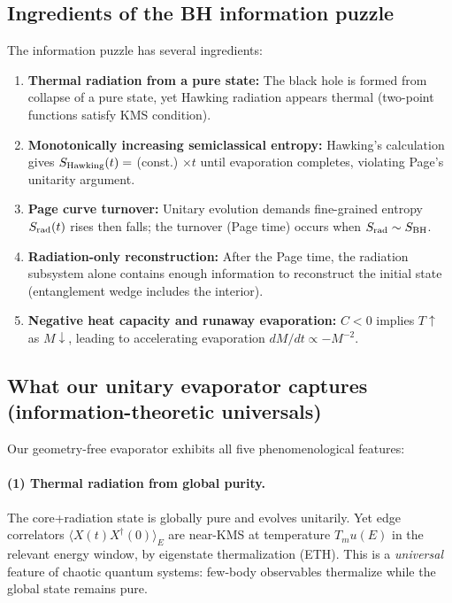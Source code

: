 \documentclass[aps,prx,onecolumn,showpacs,superscriptaddress,longbibliography,nofootinbib]{revtex4-2}
\def\mu{mu}%
\begin{document}
\subsection{Ingredients of the BH information puzzle}

The information puzzle has several ingredients:
\begin{enumerate}[leftmargin=*]
\item \textbf{Thermal radiation from a pure state:} The black hole is formed from collapse of a pure state, yet Hawking radiation appears thermal (two-point functions satisfy KMS condition).
\item \textbf{Monotonically increasing semiclassical entropy:} Hawking's calculation gives $S_{\rm Hawking}(t) = $ (const.) $ \times t$ until evaporation completes, violating Page's unitarity argument.
\item \textbf{Page curve turnover:} Unitary evolution demands fine-grained entropy $S_{\rm rad}(t)$ rises then falls; the turnover (Page time) occurs when $S_{\rm rad} \sim S_{\rm BH}$.
\item \textbf{Radiation-only reconstruction:} After the Page time, the radiation subsystem alone contains enough information to reconstruct the initial state (entanglement wedge includes the interior).
\item \textbf{Negative heat capacity and runaway evaporation:} $C < 0$ implies $T \uparrow$ as $M \downarrow$, leading to accelerating evaporation $dM/dt \propto -M^{-2}$.
\end{enumerate}

\subsection{What our unitary evaporator captures (information-theoretic universals)}

Our geometry-free evaporator exhibits all five phenomenological features:

\paragraph{(1) Thermal radiation from global purity.}
The core+radiation state is globally pure and evolves unitarily. Yet edge correlators $\langle X(t) X^\dagger(0) \rangle_E$ are near-KMS at temperature $T_\mu(E)$ in the relevant energy window, by eigenstate thermalization (ETH). This is a \emph{universal} feature of chaotic quantum systems: few-body observables thermalize while the global state remains pure.
\end{document}
